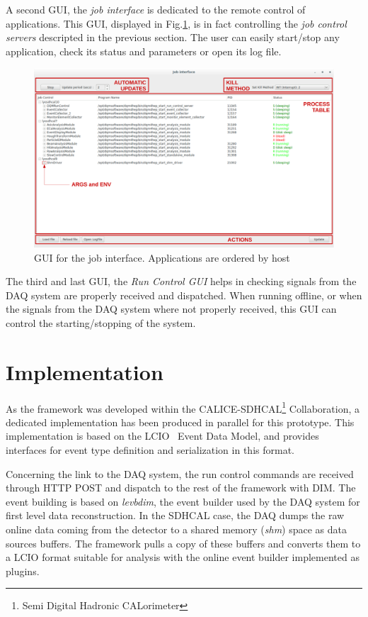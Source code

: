 \documentclass[conference]{IEEEtran}
\begin{document}
A second GUI, the \textit{job interface} is dedicated to the remote control of applications. This GUI, displayed in Fig.\ref{fig:JobControlGUI}, is in fact controlling the \textit{job control servers} descripted in the previous section. The user can easily start/stop any application, check its status and parameters or open its log file.
\begin{figure}[p]
  \begin{center}
    \includegraphics[width=0.95\linewidth]{figs/JobControlGui.pdf}
    \caption{\label{fig:JobControlGUI} GUI for the job interface. Applications are ordered by host}
  \end{center}
\end{figure}

The third and last GUI, the \textit{Run Control GUI} helps in checking signals from the DAQ system are properly received and dispatched. When running offline, or when the signals from the DAQ system where not properly received, this GUI can control the starting/stopping of the system.

\section{Implementation}

As the framework was developed within the CALICE-SDHCAL\footnote{Semi Digital Hadronic CALorimeter} Collaboration, a dedicated implementation has been produced in parallel for this prototype. This implementation is based on the LCIO~\cite{LCIO} Event Data Model, and provides interfaces for event type definition and serialization in this format.


Concerning the link to the DAQ system, the run control commands are received through HTTP POST and dispatch to the rest of the framework with DIM. The event building is based on \textit{levbdim}, the event builder used by the DAQ system for first level data reconstruction. In the SDHCAL case, the DAQ dumps the raw online data coming from the detector to a shared memory (\textit{shm}) space as data sources buffers. The framework pulls a copy of these buffers and converts them to a LCIO format suitable for analysis with the online event builder implemented as plugins.
\end{document}
